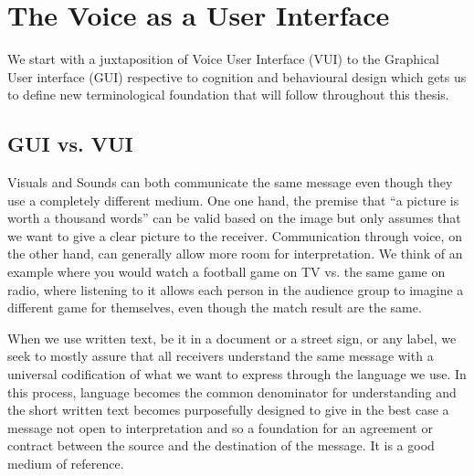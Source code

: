
\chapter{The Voice as a User Interface} 
\label{vui}


We start with a juxtaposition of Voice User Interface (VUI) to the Graphical User interface (GUI) respective to cognition and behavioural design which gets us to define new terminological foundation that will follow throughout this thesis.

\section{GUI vs. VUI}
\label{guivsvui}

Visuals and Sounds can both communicate the same message even though they use a  completely different medium. One one hand, the premise that ``a picture is worth a thousand words'' can be valid based on the image but only assumes that we want to give a clear picture to the receiver. Communication through voice, on the other hand, can generally allow more room for interpretation. We think of an example where you would watch a football game on TV vs. the same game on radio, where listening to it allows each person in the audience group to imagine a different game for themselves, even though the match result are the same.



When we use written text, be it in a document or a street sign, or any label, we seek to mostly assure that all receivers understand the same message with a universal codification of what we want to express through the language we use. In this process, language becomes the common denominator for understanding and the short written text becomes purposefully designed to give in the best case a message not open to interpretation and so a foundation for an agreement or contract between the source and the destination of the message. It is a good medium of reference. 

